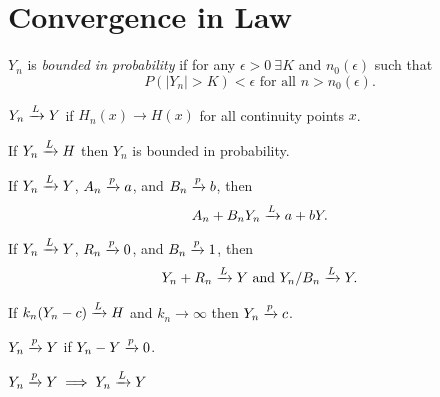 \section{Convergence in Law}%
\label{sec:convergence_in_law}

\begin{definition}
    $Y_n$ is \textit{bounded in probability} if for any $\epsilon>0\ \exists K$
    and $n_0(\epsilon)$ such that
    \begin{equation*}
        P(|Y_n| > K) < \epsilon \text{ for all } n > n_0(\epsilon).
    \end{equation*}
\end{definition}

\begin{definition}
    $Y_n \xrightarrow{L} Y$ if $H_n(x) \to H(x)$ for all continuity points $x$.
\end{definition}

\begin{thm}
    If $Y_n \xrightarrow{L} H$ then $Y_n$ is bounded in probability.
\end{thm}

\begin{thm}
    If $Y_n \xrightarrow{L} Y$, $A_n \xrightarrow{p} a$, and $B_n \xrightarrow{p} b$, then
    \begin{equation*}
        A_n + B_n Y_n \xrightarrow{L} a + b Y.
    \end{equation*}
\end{thm}

\begin{corollary}
    If $Y_n \xrightarrow{L} Y$, $R_n \xrightarrow{p} 0$, and $B_n \xrightarrow{p} 1$, then
    \begin{equation*}
        Y_n + R_n \xrightarrow{L} Y \text{ and } Y_n / B_n \xrightarrow{L} Y.
    \end{equation*}
\end{corollary}

\begin{thm}
    If $k_n (Y_n - c) \xrightarrow{L} H$ and $k_n \to \infty$ then $Y_n \xrightarrow{p} c$.
\end{thm}

\begin{definition}
    $Y_n \xrightarrow{p} Y$ if $Y_n - Y \xrightarrow{p} 0$.
\end{definition}

\begin{thm}
    $Y_n \xrightarrow{p} Y \implies Y_n \xrightarrow{L} Y$ 
\end{thm}
